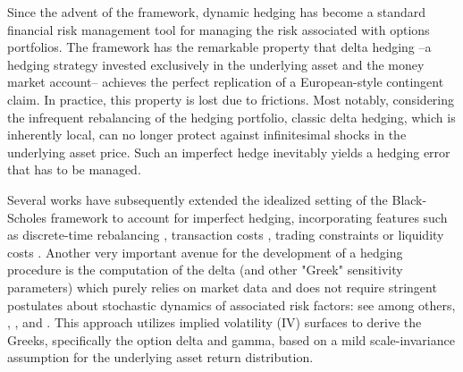 \documentclass[12pt]{article}
\begin{document}
Since the advent of the \cite{BlackScholes} framework, dynamic hedging has become a standard financial risk management tool for managing the risk associated with options portfolios. The \cite{BlackScholes} framework has the remarkable property that delta hedging --a hedging strategy invested exclusively in the underlying asset and the money market account-- achieves the perfect replication of a European-style contingent claim. In practice, this property is lost due to frictions. Most notably, considering the infrequent rebalancing of the hedging portfolio, classic delta hedging, which is inherently local, can no longer protect against infinitesimal shocks in the underlying asset price. Such an imperfect hedge inevitably yields a hedging error that has to be managed. %

Several works have subsequently extended the idealized setting of the Black-Scholes framework to account for imperfect hedging, incorporating features such as discrete-time rebalancing \citep{BOYLE1980259}, transaction costs \citep{Leland, boyle1992option, toft1996mean, meindl2008dynamic, zakamouline2009best, lai2009option}, trading constraints \citep{edirisinghe1993optimal} or liquidity costs \citep{frey1998perfect,cetin2010option,gueant2017option}. Another very important avenue for the development of a hedging procedure is the computation of the delta (and other "Greek" sensitivity parameters) which purely relies on market data and does not require stringent postulates about stochastic dynamics of associated risk factors: see among others, \cite{BATES2005195}, \cite{ALEXANDER2007}, and \cite{franccois2021smile}. 
This approach utilizes implied volatility (IV) surfaces to derive the Greeks, specifically the option delta and gamma, based on a mild scale-invariance assumption for the underlying asset return distribution. 
\end{document}
